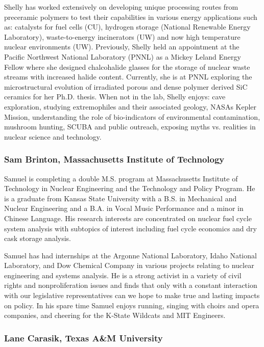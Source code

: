 Shelly has worked extensively on developing unique processing routes from
preceramic polymers to test their capabilities in various energy applications
such as: catalysts for fuel cells (CU), hydrogen storage (National Renewable
Energy Laboratory), waste-to-energy incinerators (UW) and now high temperature
nuclear environments (UW). Previously, Shelly held an appointment at the Pacific
Northwest National Laboratory (PNNL) as a Mickey Leland Energy Fellow where she
designed chalcohalide glasses for the storage of nuclear waste streams with
increased halide content. Currently, she is at PNNL exploring the
microstructural evolution of irradiated porous and dense polymer derived SiC
ceramics for her Ph.D. thesis. When not in the lab, Shelly enjoys: cave
exploration, studying extremophiles and their associated geology, NASAs Kepler
Mission, understanding the role of bio-indicators of environmental
contamination, mushroom hunting, SCUBA and public outreach, exposing myths
vs. realities in nuclear science and technology.

\subsubsection*{Sam Brinton, Massachusetts Institute of Technology}

Samuel is completing a double M.S. program at Massachusetts Institute of
Technology in Nuclear Engineering and the Technology and Policy Program. He is a
graduate from Kansas State University with a B.S. in Mechanical and Nuclear
Engineering and a B.A. in Vocal Music Performance and a minor in Chinese
Language. His research interests are concentrated on nuclear fuel cycle system
analysis with subtopics of interest including fuel cycle economics and dry cask
storage analysis.

Samuel has had internships at the Argonne National Laboratory, Idaho National
Laboratory, and Dow Chemical Company in various projects relating to nuclear
engineering and systems analysis. He is a strong activist in a variety of civil
rights and nonproliferation issues and finds that only with a constant
interaction with our legislative representatives can we hope to make true and
lasting impacts on policy. In his spare time Samuel enjoys running, singing with
choirs and opera companies, and cheering for the K-State Wildcats and MIT
Engineers.

\subsubsection*{Lane Carasik, Texas A\&M University}

